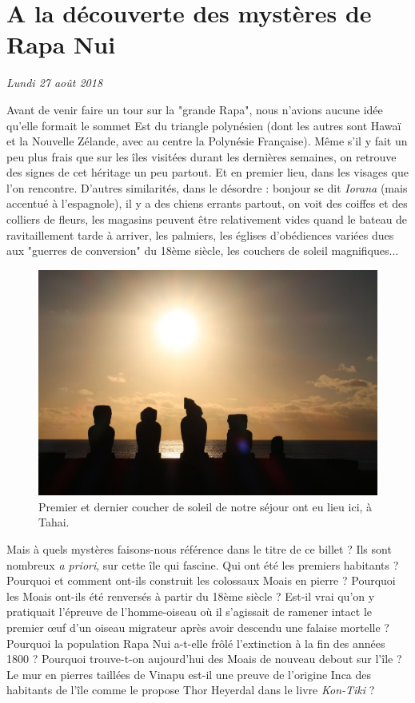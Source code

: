 \hypertarget{a-la-duxe9couverte-des-mystuxe8res-de-rapa-nui}{%
\section{A la découverte des mystères de Rapa
Nui}\label{a-la-duxe9couverte-des-mystuxe8res-de-rapa-nui}}

\emph{Lundi 27 août 2018}

Avant de venir faire un tour sur la "grande Rapa", nous n'avions aucune
idée qu'elle formait le sommet Est du triangle polynésien (dont les
autres sont Hawaï et la Nouvelle Zélande, avec au centre la Polynésie
Française). Même s'il y fait un peu plus frais que sur les îles visitées
durant les dernières semaines, on retrouve des signes de cet héritage un
peu partout. Et en premier lieu, dans les visages que l'on rencontre.
D'autres similarités, dans le désordre : bonjour se dit \emph{Iorana}
(mais accentué à l'espagnole), il y a des chiens errants partout, on
voit des coiffes et des colliers de fleurs, les magasins peuvent être
relativement vides quand le bateau de ravitaillement tarde à arriver,
les palmiers, les églises d'obédiences variées dues aux "guerres de
conversion" du 18ème siècle, les couchers de soleil magnifiques...

\begin{figure}
\centering
\includegraphics{images/20180827_tahai.JPG}
\caption{Premier et dernier coucher de soleil de notre séjour ont eu
lieu ici, à Tahai.}
\end{figure}

Mais à quels mystères faisons-nous référence dans le titre de ce billet
? Ils sont nombreux \emph{a priori}, sur cette île qui fascine. Qui ont
été les premiers habitants ? Pourquoi et comment ont-ils construit les
colossaux Moais en pierre ? Pourquoi les Moais ont-ils été renversés à
partir du 18ème siècle ? Est-il vrai qu'on y pratiquait l'épreuve de
l'homme-oiseau où il s'agissait de ramener intact le premier œuf d'un
oiseau migrateur après avoir descendu une falaise mortelle ? Pourquoi la
population Rapa Nui a-t-elle frôlé l'extinction à la fin des années 1800
? Pourquoi trouve-t-on aujourd'hui des Moais de nouveau debout sur l'île
? Le mur en pierres taillées de Vinapu est-il une preuve de l'origine
Inca des habitants de l'île comme le propose Thor Heyerdal dans le livre
\emph{Kon-Tiki} ?


